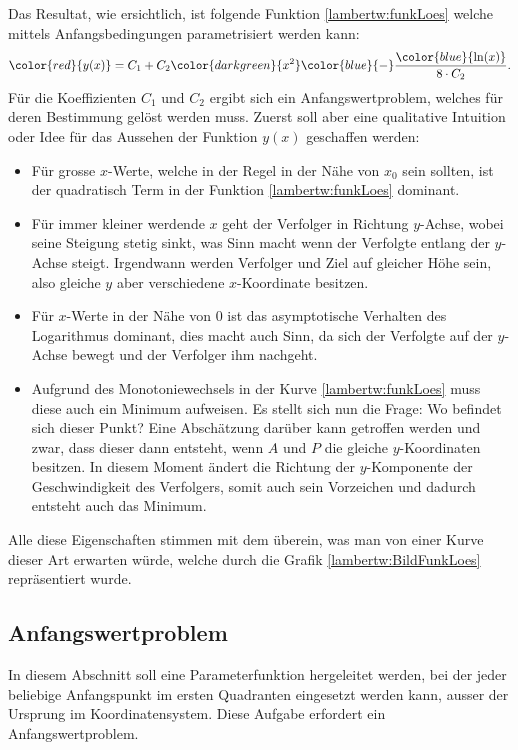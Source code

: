 Das Resultat, wie ersichtlich, ist folgende Funktion \eqref{lambertw:funkLoes} welche mittels Anfangsbedingungen parametrisiert werden kann: 
\begin{equation}
	{\color{red}{y(x)}}
	=
	C_1 + C_2 {\color{darkgreen}{x^2}} {\color{blue}{-}} \frac{\color{blue}{\operatorname{ln}(x)}}{8 \cdot C_2}.
	\label{lambertw:funkLoes}
\end{equation}
Für die Koeffizienten \(C_1\) und \(C_2\) ergibt sich ein Anfangswertproblem, welches für deren Bestimmung gelöst werden muss. Zuerst soll aber eine qualitative Intuition oder Idee für das Aussehen der Funktion \(y(x)\) geschaffen werden:
\begin{itemize}
	\item
	Für grosse \(x\)-Werte, welche in der Regel in der Nähe von \(x_0\) sein sollten, ist der quadratisch Term in der Funktion \eqref{lambertw:funkLoes} dominant. 
	\item
	Für immer kleiner werdende \(x\) geht der Verfolger in Richtung \(y\)-Achse, wobei seine Steigung stetig sinkt, was Sinn macht wenn der Verfolgte entlang der \(y\)-Achse steigt. Irgendwann werden Verfolger und Ziel auf gleicher Höhe sein, also gleiche \(y\) aber verschiedene \(x\)-Koordinate besitzen.
	\item
	Für \(x\)-Werte in der Nähe von \(0\) ist das asymptotische Verhalten des Logarithmus dominant, dies macht auch Sinn, da sich der Verfolgte auf der \(y\)-Achse bewegt und der Verfolger ihm nachgeht.
	\item
	Aufgrund des Monotoniewechsels in der Kurve \eqref{lambertw:funkLoes} muss diese auch ein Minimum aufweisen. Es stellt sich nun die Frage: Wo befindet sich dieser Punkt? 
	Eine Abschätzung darüber kann getroffen werden und zwar, dass dieser dann entsteht, wenn \(A\) und \(P\) die gleiche \(y\)-Koordinaten besitzen. In diesem Moment ändert die Richtung der \(y\)-Komponente der Geschwindigkeit des Verfolgers, somit auch sein Vorzeichen und dadurch entsteht auch das Minimum.
\end{itemize}
Alle diese Eigenschaften stimmen mit dem überein, was man von einer Kurve dieser Art erwarten würde, welche durch die Grafik \ref{lambertw:BildFunkLoes} repräsentiert wurde.

\subsection{Anfangswertproblem 
	\label{lambertw:subsection:AllgLoes}}
In diesem Abschnitt soll eine Parameterfunktion hergeleitet werden, bei der jeder beliebige Anfangspunkt im ersten Quadranten eingesetzt werden kann, ausser der Ursprung im Koordinatensystem. Diese Aufgabe erfordert ein Anfangswertproblem.

